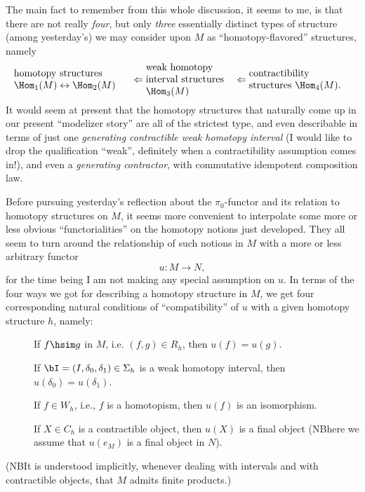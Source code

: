 The main fact to remember from this whole discussion, it seems to me,
is that there are not really \emph{four}, but only \emph{three}
essentially distinct types of structure (among yesterday's) we may
consider upon $M$ as ``homotopy-flavored'' structures, namely
\[\parbox[c]{0.345\textwidth}{\raggedright
  homotopy structures $\Hom_1(M)\leftrightarrow\Hom_2(M)$}
\Leftarrow
\parbox[c]{0.26\textwidth}{\raggedright
  weak homotopy interval structures $\Hom_3(M)$}
\Leftarrow
\parbox[c]{0.30\textwidth}{\raggedright
  contractibility structures $\Hom_4(M)$.}
\]
It would seem at present that the homotopy structures that naturally
come up in our present ``modelizer story'' are all of the strictest
type, and even describable in terms of just one \emph{generating
  contractible weak homotopy interval} (I would like to drop the
qualification ``weak'', definitely when a contractibility assumption
comes in!), and even a \emph{generating contractor}, with commutative
idempotent composition law.

\label{sec:53}%
Before pursuing yesterday's reflection about the $\pi_0$-functor and
its relation to homotopy structures on $M$, it seems more convenient
to interpolate some more or less obvious ``functorialities'' on the
homotopy notions just developed. They all seem to turn around the
relationship of such notions in $M$ with a more or less arbitrary
functor
\[ u : M\to N,\]
for the time being I am not making any special assumption on $u$. In
terms of the four ways we got for describing a homotopy structure in
$M$, we get four corresponding natural conditions of ``compatibility''
of $u$ with a given homotopy structure $h$, namely:
\begin{description}
\item[]
  If $f \hsim g$ in $M$, i.e. $(f,g)\in R_h$, then $u(f)=u(g)$.
\item[]
  If $\bI=(I,\delta_0,\delta_1)\in\Sigma_h$ is a weak homotopy
  interval, then $u(\delta_0)=u(\delta_1)$.
\item[]
  If $f\in W_h$, i.e., $f$ is a homotopism, then $u(f)$ is an isomorphism.
\item[]
  If $X\in C_h$ is a contractible object, then $u(X)$ is a final
  object (NB\enspace here we assume that $u(e_M)$ is a final object in $N$).
\end{description}
(NB\enspace It is understood implicitly, whenever dealing with intervals and
with contractible objects, that $M$ admits finite products.)

